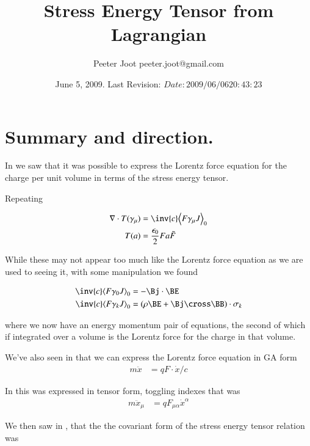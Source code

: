 \documentclass{article}
\title{Stress Energy Tensor from Lagrangian}\label{chap:stress_energy_noethers}
\author{Peeter Joot \quad peeter.joot@gmail.com }
\date{ June 5, 2009.  Last Revision: $Date: 2009/06/06 20:43:23 $ }
\begin{document}
\maketitle{}
\tableofcontents
\section{ Summary and direction. }

In 
\cite{PJstressEnergyLorentz} 
we saw that it was
possible to express the Lorentz force equation for the charge per unit
volume in terms of the stress energy tensor.

Repeating 

\begin{align}
\grad \cdot T(\gamma_\mu) &= \inv{c} \gpgradezero{ F \gamma_\mu J } \\
T(a) &= \frac{\epsilon_0}{2} F a \tilde{F}
\end{align}

While these
may not appear too much like the Lorentz force equation as we are used
to seeing it, with some manipulation we found 

\begin{align}
\inv{c} \gpgradezero{ F \gamma_0 J } &= -\Bj \cdot \BE \\
\inv{c} \gpgradezero{ F \gamma_k J } &= (\rho \BE + \Bj \cross \BB) \cdot \sigma_k
\end{align}

where we now have an energy momentum pair of equations, the second
of which if integrated over a volume is the Lorentz force for the charge
in that volume.

We've also seen in
that we can express the Lorentz force equation in GA form
\begin{align}
m \ddot{x} &= q F \cdot \dot{x}/c
\end{align}

In 
this was expressed in tensor form, toggling indexes that was
\begin{align}
m \ddot{x}_\mu &= {q} F_{\mu\alpha} \dot{x}^\alpha
\end{align}

We then saw in
\cite{PJenMtensor}
, that the
the covariant form of the stress energy tensor relation was
\end{document}
